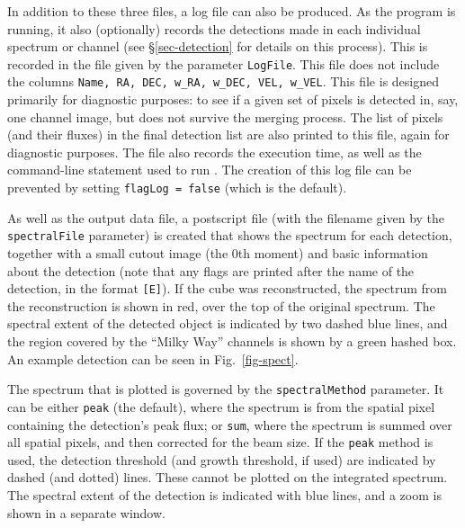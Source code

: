 In addition to these three files, a log file can also be produced. As
the program is running, it also (optionally) records the detections
made in each individual spectrum or channel (see \S\ref{sec-detection}
for details on this process). This is recorded in the file given by
the parameter \texttt{LogFile}. This file does not include the columns
\texttt{Name, RA, DEC, w\_RA, w\_DEC, VEL, w\_VEL}. This file is
designed primarily for diagnostic purposes: \eg to see if a given set
of pixels is detected in, say, one channel image, but does not survive
the merging process. The list of pixels (and their fluxes) in the
final detection list are also printed to this file, again for
diagnostic purposes. The file also records the execution time, as well
as the command-line statement used to run \duchamp. The creation of
this log file can be prevented by setting \texttt{flagLog = false}
(which is the default).




As well as the output data file, a postscript file (with the filename
given by the \texttt{spectralFile} parameter) is created that shows
the spectrum for each detection, together with a small cutout image
(the 0th moment) and basic information about the detection (note that
any flags are printed after the name of the detection, in the format
\texttt{[E]}). If the cube was reconstructed, the spectrum from the
reconstruction is shown in red, over the top of the original
spectrum. The spectral extent of the detected object is indicated by
two dashed blue lines, and the region covered by the ``Milky Way''
channels is shown by a green hashed box. An example detection can be
seen in Fig.~\ref{fig-spect}.

The spectrum that is plotted is governed by the
\texttt{spectralMethod} parameter. It can be either \texttt{peak} (the
default), where the spectrum is from the spatial pixel containing the
detection's peak flux; or \texttt{sum}, where the spectrum is summed
over all spatial pixels, and then corrected for the beam size. If the
\texttt{peak} method is used, the detection threshold (and growth
threshold, if used) are indicated by dashed (and dotted) lines. These
cannot be plotted on the integrated spectrum. The spectral extent of
the detection is indicated with blue lines, and a zoom is shown in a
separate window.

